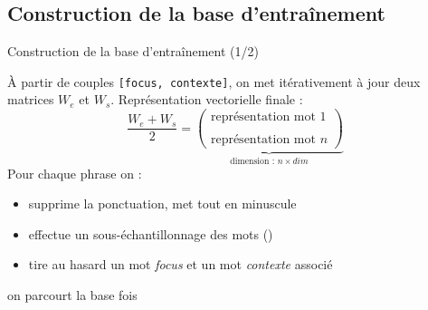 \documentclass[10pt,xcolor=table,color={dvipsnames,usenames},ignorenonframetext,usepdftitle=false,french]{beamer}
\begin{document}
\hypertarget{construction-de-la-base-dentrauxeenement}{%
\subsection{Construction de la base
d'entraînement}\label{construction-de-la-base-dentrauxeenement}}

\begin{frame}[fragile]{Construction de la base d'entraînement (1/2)}
\protect\hypertarget{construction-de-la-base-dentrauxeenement-12}{}

\bcoutil À partir de couples \texttt{{[}focus,\ contexte{]}}, on met
itérativement à jour deux matrices \(W_e\) et \(W_s\). Représentation
vectorielle finale : \[
\frac{W_e+W_s}{2}=\underbrace{
\begin{pmatrix}
\text{représentation mot 1} \\
\\
\text{représentation mot }n 
\end{pmatrix}}_{\text{dimension : }n\times dim}
\] \pause Pour chaque phrase on :

\begin{itemize}
\item
  supprime la ponctuation, met tout en minuscule
\item
  effectue un sous-échantillonnage des mots ()
\item
  tire au hasard un mot \emph{focus} et un mot \emph{contexte} associé
\end{itemize}

\faArrowCircleRight{} on parcourt la base  fois

\end{frame}
\end{document}
